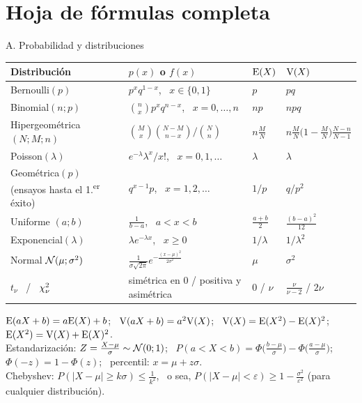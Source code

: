 \newpage
\titleformat{\section}{\Large\bfseries\color{azul}}{}{0em}{}
\section{Hoja de fórmulas completa}
{\small
\begin{hoja}{A. Probabilidad y distribuciones}
\renewcommand{\arraystretch}{1.45}
\begin{tabular}{@{}>{\raggedright\arraybackslash}p{3.0cm}>{\raggedright\arraybackslash}p{5.4cm}ll@{}}
\toprule
Distribución & $p(x)$ o $f(x)$ & $\mathrm{E}(X)$ & $\mathrm{V}(X)$\\\midrule
Bernoulli$(p)$ & $p^x q^{1-x}$, \ $x\in\{0,1\}$ & $p$ & $pq$\\
Binomial$(n;p)$ & $\binom nx p^xq^{n-x}$, \ $x=0,\dots,n$ & $np$ & $npq$\\
Hipergeométrica $(N;M;n)$ & $\binom Mx\binom{N-M}{n-x}\big/\binom Nn$ & $n\frac MN$ & $n\frac MN\big(1-\frac MN\big)\frac{N-n}{N-1}$\\
Poisson$(\lambda)$ & $e^{-\lambda}\lambda^x/x!$, \ $x=0,1,\dots$ & $\lambda$ & $\lambda$\\
Geométrica$(p)$ (ensayos hasta el 1.\textsuperscript{er} éxito) & $q^{x-1}p$, \ $x=1,2,\dots$ & $1/p$ & $q/p^2$\\
Uniforme $(a;b)$ & $\frac1{b-a}$, \ $a<x<b$ & $\frac{a+b}2$ & $\frac{(b-a)^2}{12}$\\
Exponencial$(\lambda)$ & $\lambda e^{-\lambda x}$, \ $x\ge0$ & $1/\lambda$ & $1/\lambda^2$\\
Normal $\mathcal{N}(\mu;\sigma^2)$ & $\frac{1}{\sigma\sqrt{2\pi}}e^{-\frac{(x-\mu)^2}{2\sigma^2}}$ & $\mu$ & $\sigma^2$\\
$t_\nu$ \ / \ $\chi^2_\nu$ & simétrica en 0 / positiva y asimétrica & $0$ / $\nu$ & $\frac{\nu}{\nu-2}$ / $2\nu$\\
\bottomrule
\end{tabular}

\smallskip
$\mathrm{E}(aX+b)=a\mathrm{E}(X)+b$; \ $\mathrm{V}(aX+b)=a^2\mathrm{V}(X)$; \ $\mathrm{V}(X)=\mathrm{E}(X^2)-\mathrm{E}(X)^2$; \ $\mathrm{E}(X^2)=\mathrm{V}(X)+\mathrm{E}(X)^2$.\\
Estandarización: $Z=\frac{X-\mu}{\sigma}\sim\mathcal{N}(0;1)$; \ $P(a<X<b)=\Phi\big(\frac{b-\mu}{\sigma}\big)-\Phi\big(\frac{a-\mu}{\sigma}\big)$; \ $\Phi(-z)=1-\Phi(z)$; \ percentil: $x=\mu+z\sigma$.\\
Chebyshev: $P(|X-\mu|\ge k\sigma)\le\frac1{k^2}$, \ o sea, $P(|X-\mu|<\varepsilon)\ge1-\frac{\sigma^2}{\varepsilon^2}$ (para cualquier distribución).
\end{hoja}

}
